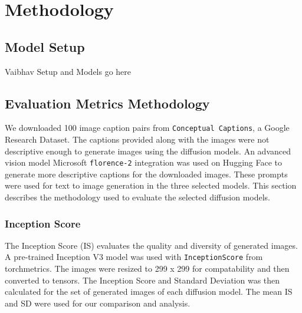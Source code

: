 \documentclass{article}
\begin{document}




\section{Methodology}
\subsection{Model Setup}
Vaibhav Setup and Models go here

\subsection{Evaluation Metrics Methodology}
We downloaded 100 image caption pairs from \texttt{Conceptual Captions}, a Google Research Dataset. 
The captions provided along with the images were not descriptive enough to generate images 
using the diffusion models. An advanced vision model Microsoft \texttt{florence-2} integration was used on Hugging Face 
to generate more descriptive captions for the downloaded images. These prompts were used for text to image generation 
in the three selected models. This section describes the methodology used to evaluate the selected diffusion models. 

\subsubsection{Inception Score}
The Inception Score (IS) evaluates the quality and diversity of generated images. A pre-trained Inception V3 model was used with 
\texttt{InceptionScore} from torchmetrics. The images were resized to 299 x 299 for compatability and then converted to tensors. The Inception Score
and Standard Deviation was then calculated for the set of generated images of each diffusion model. The mean IS and SD were used for our comparison and analysis.
\end{document}
